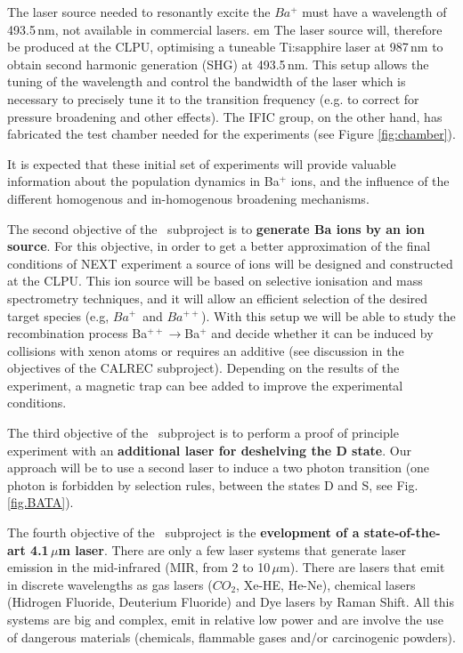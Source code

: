 The laser source needed to resonantly excite the $Ba^{+}$ must have a wavelength of 493.5\,nm, not available in commercial lasers. {em The laser source will, therefore be produced at the CLPU}, optimising a tuneable Ti:sapphire laser at 987\,nm to obtain second harmonic generation (SHG) at 493.5\,nm. This setup allows the tuning of the wavelength and control the bandwidth of the laser which is necessary to precisely tune it to the transition frequency (e.g. to correct for pressure broadening and other effects). The IFIC group, on the other hand, has fabricated the test chamber needed for the experiments 
(see Figure \ref{fig:chamber}). 

It is expected that these initial set of experiments will provide valuable information about the population dynamics in Ba$^+$ ions, and the influence of the different homogenous and in-homogenous broadening mechanisms. 

The second objective of the \BATA\ subproject is to {\bf generate Ba ions by an ion source}. For this objective, in order to get a better approximation of the final conditions of NEXT experiment a source of ions will be designed and constructed at the CLPU. This ion source will be based on selective ionisation and mass spectrometry techniques, and it will allow an efficient selection of the desired target species (e.g, $Ba^{+}$~and $Ba^{++}$). With this setup we will be able to study the recombination process Ba$^{++}\rightarrow$Ba$^{+}$ and decide whether it can be induced by collisions with xenon atoms or requires an additive (see discussion in the objectives of the CALREC subproject). Depending on the results of the experiment, a magnetic trap can bee added to improve the experimental conditions. 

The third objective of the \BATA\ subproject is to perform a proof of principle experiment with an {\bf additional laser for deshelving the D state}. Our approach will be to use a second laser to induce a two photon transition (one photon is forbidden by selection rules, between the states D and S, see Fig.\,\ref{fig.BATA}). 	

The fourth objective of the \BATA\ subproject is the {\bf evelopment of a state-of-the-art 4.1\,$\mu$m laser}. There are only a few laser systems that generate laser emission in the mid-infrared (MIR, from 2 to 10\,$\mu$m). There are lasers that emit in discrete wavelengths as gas lasers ($CO_2$, Xe-HE, He-Ne), chemical lasers (Hidrogen Fluoride, Deuterium Fluoride) and Dye lasers by Raman Shift. All this systems are big and complex, emit in relative low power and are involve the use of dangerous materials (chemicals, flammable gases and/or carcinogenic powders). 

